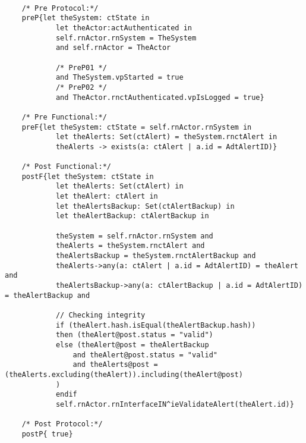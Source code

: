 	\scriptsize
	\vspace{0.5cm}
	\begin{lstlisting}[style=MessirStyle,firstnumber=auto,captionpos=b,caption={\msrmessir (MCL-oriented) specification of the operation \emph{oeValidateAlert}.},label=OM-actCoordinator-oeValidateAlert-MCL-LST]

	/* Pre Protocol:*/ 
	preP{let theSystem: ctState in
	  		let theActor:actAuthenticated in
	  		self.rnActor.rnSystem = TheSystem
	  		and self.rnActor = TheActor
	  
			/* PreP01 */
	  		and TheSystem.vpStarted = true
			/* PreP02 */
	  		and TheActor.rnctAuthenticated.vpIsLogged = true}
	
	/* Pre Functional:*/
	preF{let theSystem: ctState = self.rnActor.rnSystem in
	  		let theAlerts: Set(ctAlert) = theSystem.rnctAlert in
	  		theAlerts -> exists(a: ctAlert | a.id = AdtAlertID)}
	
	/* Post Functional:*/ 
	postF{let theSystem: ctState in
	  		let theAlerts: Set(ctAlert) in
	  		let theAlert: ctAlert in
	  		let theAlertsBackup: Set(ctAlertBackup) in
	  		let theAlertBackup: ctAlertBackup in
	  		
	  		theSystem = self.rnActor.rnSystem and
	  		theAlerts = theSystem.rnctAlert and
	  		theAlertsBackup = theSystem.rnctAlertBackup and
	  		theAlerts->any(a: ctAlert | a.id = AdtAlertID) = theAlert and
	  		theAlertsBackup->any(a: ctAlertBackup | a.id = AdtAlertID) = theAlertBackup and
	  		
	  		// Checking integrity
	  		if (theAlert.hash.isEqual(theAlertBackup.hash))
	  		then (theAlert@post.status = "valid")
	  		else (theAlert@post = theAlertBackup
	  			and theAlert@post.status = "valid"
	  			and theAlerts@post = (theAlerts.excluding(theAlert)).including(theAlert@post)
	  		)
	  		endif
	  		self.rnActor.rnInterfaceIN^ieValidateAlert(theAlert.id)}
	
	/* Post Protocol:*/ 
	postP{ true}
	
	\end{lstlisting}
	\normalsize 
	
	
	
	





